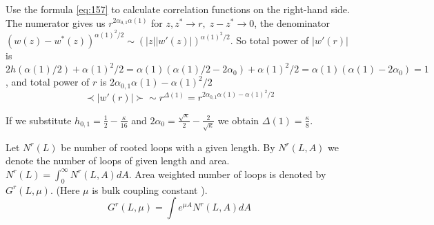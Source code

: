\documentclass[12pt]{article}
\begin{document}
Use the formula \eqref{eq:157} to calculate correlation functions on the right-hand side. The
numerator gives us $r^{2\alpha_{0,1}\alpha(1)}$ for $z,z^{*}\to r,\; z-z^{*}\to 0$, the denominator
$(w(z)-w^{*}(z))^{\alpha(1)^{2}/2}\sim (|z| |w'(z)|)^{\alpha(1)^{2}/2}$. So total power of $|w'(r)|$
is 
$2h(\alpha(1)/2)+\alpha(1)^{2}/2=\alpha(1)
(\alpha(1)/2-2\alpha_{0})+\alpha(1)^{2}/2=\alpha(1)(\alpha(1)-2\alpha_{0})=1$, and total power of
$r$ is $2\alpha_{0,1}\alpha(1)-\alpha(1)^{2}/2$
\begin{equation}
  \label{eq:158}
  \prec |w'(r)|\succ \sim r^{\Delta(1)}=r^{2\alpha_{0,1}\alpha(1)-\alpha(1)^{2}/2}
\end{equation}

If we substitute $h_{0,1}=\frac{1}{2}-\frac{\kappa}{16}$ and
$2\alpha_{0}=\frac{\sqrt{\kappa}}{2}-\frac{2}{\sqrt{\kappa}}$ we obtain $\Delta(1)=\frac{\kappa}{8}$.



Let $N^r(L)$ be number of rooted loops with a given length. By $N^r(L,A)$ we denote the number of
loops of given length and area. $N^r(L)=\int_0^{\infty} N^r(L,A) dA$. Area weighted number of loops
is denoted by $G^r(L,\mu)$. (Here $\mu$ is bulk coupling constant ).
\begin{equation}
  \label{eq:2}
  G^r(L,\mu)=\int e^{\mu A} N^r(L,A) dA
\end{equation}
\end{document}
